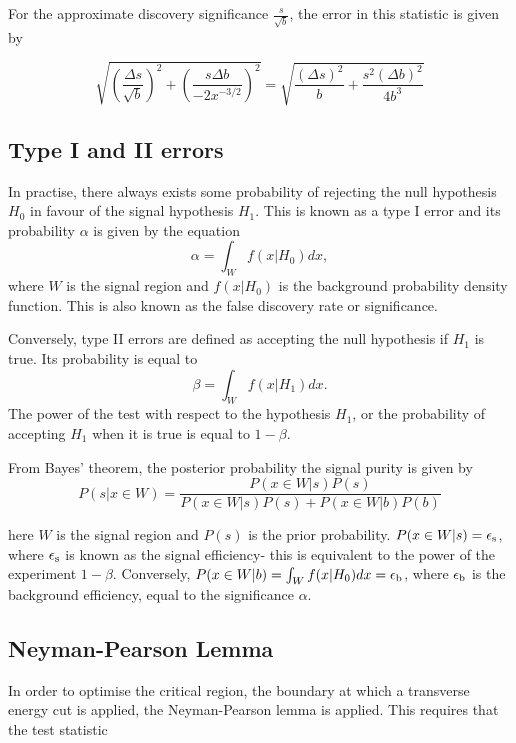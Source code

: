 \documentclass{article}
\begin{document}
For the approximate discovery significance $\frac{s}{\sqrt{b}}$, the error in this statistic is given by

\begin{equation}
\sqrt{\left( \frac{\Delta s}{\sqrt{b}} \right)^2 + \left( \frac{s\Delta b}{-2x^{-3/2}} \right)^2 } = \sqrt{\frac{(\Delta s)^2}{b} + \frac{s^2 (\Delta b)^2}{4b^{3}}}
\end{equation}

\subsection{Type I and II errors}

In practise, there always exists some probability of rejecting the null hypothesis $H_0$ in favour of the signal hypothesis $H_1$. This is known as a type I error and its probability $\alpha$ is given by the equation
\begin{equation}
\alpha = \int_{W}f(x|H_0)dx,
\end{equation}
where $W$ is the signal region and $f(x|H_0)$ is the background probability density function. This is also known as the false discovery rate or significance.

Conversely, type II errors are defined as accepting the null hypothesis if $H_1$ is true. Its probability is equal to
\begin{equation}
\beta = \int_{W}f(x|H_1)dx.
\end{equation}
The power of the test with respect to the hypothesis $H_1$, or the probability of accepting $H_1$ when it is true is equal to $1-\beta$.

From Bayes' theorem, the posterior probability the signal purity is given by
\begin{equation}
P(s|x\in W) = \frac{P(x\in W|s)P(s)}{P(x\in W|s)P(s) + P(x \in W|b)P(b)}
\end{equation}

here $W$ is the signal region and $P(s)$ is the prior probability. $P(x\in W|s) = \epsilon_{\rm{s}}$, where $\epsilon_{\rm{s}}$ is known as the signal efficiency- this is equivalent to the power of the experiment $1-\beta$. Conversely, $P(x \in W|b) =  \int_{W}f(x|H_0)dx = \epsilon_{\rm{b}}$, where $\epsilon_{\rm{b}}$ is the background efficiency, equal to the significance $\alpha$.

\subsection{Neyman-Pearson Lemma}
In order to optimise the critical region, the boundary at which a transverse energy cut is applied, the Neyman-Pearson lemma \cite{NeymanPearsonLemma} is applied. This requires that the test statistic
\end{document}
